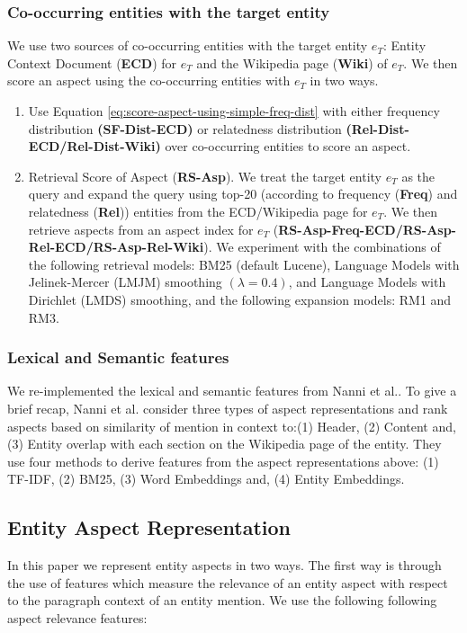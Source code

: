 \subsubsection{Co-occurring entities with the target entity} 
\label{subsubsec:Co-occurring entities with the target entity}

We use two sources of co-occurring entities with the target entity $e_T$: Entity Context Document (\textbf{ECD}) for $e_T$ and the Wikipedia page (\textbf{Wiki}) of $e_T$. We then score an aspect using the co-occurring entities with $e_T$ in two ways.

    
\begin{enumerate}
    \item Use Equation \ref{eq:score-aspect-using-simple-freq-dist} with either frequency distribution \textbf{(SF-Dist-ECD)} or relatedness distribution \textbf{(Rel-Dist-ECD/Rel-Dist-Wiki)} over co-occurring entities to score an aspect.
        
    \item Retrieval Score of Aspect (\textbf{RS-Asp}). We treat the target entity $e_T$ as the query and expand the query using top-20 (according to frequency (\textbf{Freq}) and relatedness (\textbf{Rel})) entities from the ECD/Wikipedia page for $e_T$. We then retrieve aspects from an aspect index for $e_T$ (\textbf{RS-Asp-Freq-ECD/RS-Asp-Rel-ECD/RS-Asp-Rel-Wiki}). We experiment with the combinations of the following retrieval models: BM25 (default Lucene), Language Models with Jelinek-Mercer (LMJM) smoothing $(\lambda = 0.4)$, and Language Models with Dirichlet (LMDS) smoothing, and the following expansion models: RM1 and RM3.
\end{enumerate}
    

\subsubsection{Lexical and Semantic features}
\label{subsubsec:Lexical and Semantic features} 
We re-implemented the lexical and semantic features from Nanni et
al.\cite{nanni2018entity}. To give a brief recap, Nanni et al.\cite{nanni2018entity} consider three types of aspect representations and rank aspects based on similarity of mention in context to:(1) Header, (2) Content and, (3) Entity overlap with each section on the Wikipedia page of the entity. They use four methods to derive features from the aspect representations above: (1) TF-IDF, (2) BM25, (3) Word Embeddings and, (4) Entity Embeddings.

\subsection{Entity Aspect Representation}\label{jordan-vector}
In this paper we represent entity aspects in two ways.
The first way is through the use of features which measure the relevance of an entity aspect with respect to the paragraph context of an entity mention. We use the following following aspect relevance features:

